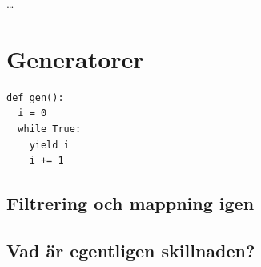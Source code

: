 \begin{frame}[fragile]
  \begin{example}
    
    \dots
    
  \end{example}
\end{frame}


\section{Generatorer}

\begin{frame}[fragile]
  \begin{lstlisting}[basicstyle=\huge,numbers=none]
def gen():
  i = 0
  while True:
    yield i
    i += 1
  \end{lstlisting}
\end{frame}

\subsection{Filtrering och mappning igen}

\begin{frame}[fragile]
  \begin{example}
    
  \end{example}

  \pause

  \begin{example}
    
  \end{example}
\end{frame}

\begin{frame}[fragile]
  \begin{example}
    
  \end{example}

  \pause

  \begin{example}
    
  \end{example}
\end{frame}

\subsection{Vad är egentligen skillnaden?}

